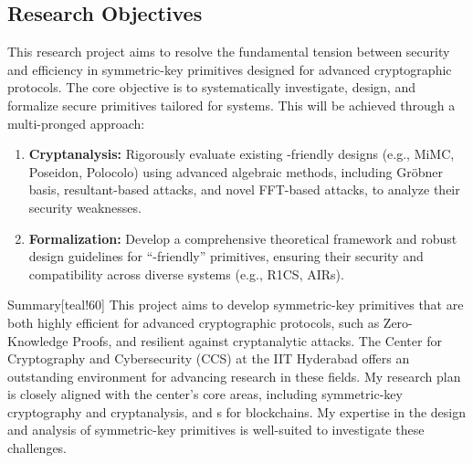 	\subsection{Research Objectives}
	This research project aims to resolve the fundamental tension between security and efficiency in symmetric-key primitives designed for advanced cryptographic protocols.
	The core objective is to systematically investigate, design, and formalize secure primitives tailored for  systems.
	This will be achieved through a multi-pronged approach:
	
	\begin{enumerate}[label=\textbf{O\arabic*.}, leftmargin=*, itemsep=2pt, start=1]
		\item \textbf{Cryptanalysis:} Rigorously evaluate existing -friendly designs (e.g., MiMC, Poseidon, Polocolo) using advanced algebraic methods, including Gr\"obner basis, resultant-based attacks, and novel FFT-based attacks, to analyze their security weaknesses.
		
		\item \textbf{Formalization:} Develop a comprehensive theoretical framework and robust design guidelines for ``-friendly'' primitives, ensuring their security and compatibility across diverse  systems (e.g., R1CS, AIRs).
	\end{enumerate}
	
	
	\begin{genericbox}{Summary}[teal!60]
		This project aims to develop symmetric-key primitives that are both highly efficient for advanced cryptographic protocols, such as Zero-Knowledge Proofs, and resilient against cryptanalytic attacks.
		The Center for Cryptography and Cybersecurity (CCS) at the IIT Hyderabad offers an outstanding environment for advancing research in these fields.
		My research plan is closely aligned with the center’s core areas, including symmetric-key cryptography and cryptanalysis, and s for blockchains.
		My expertise in the design and analysis of symmetric-key primitives is well-suited to investigate these challenges.
	\end{genericbox}
	
